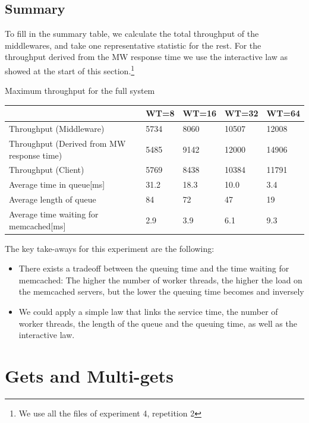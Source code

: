 \documentclass[11pt,a4paper]{article}
\begin{document}
\subsection{Summary}
To fill in the summary table, we calculate the total throughput of the middlewares, and take one representative statistic for the rest. For the throughput derived from the MW response time we use the interactive law as showed at the start of this section.\footnote{We use all the files of experiment 4, repetition 2} 
\begin{center}
	{Maximum throughput for the full system}
	\begin{tabular}{|l|p{1.5cm}|p{1.5cm}|p{1.5cm}|p{1.5cm}|}
		\hline                                            & WT=8 & WT=16 & WT=32 & WT=64 \\ 
		\hline Throughput (Middleware)                    &5734      &8060       &10507       &12008       \\ 
		\hline Throughput (Derived from MW response time) &5485      &9142       &12000       &14906       \\ 
		\hline Throughput (Client)                        &5769      &8438       &10384       &11791       \\ 
		\hline Average time in queue[ms]                      &31.2      &18.3       &10.0      &3.4       \\ 
		\hline Average length of queue                    &84      &72       &47       &19       \\ 
		\hline Average time waiting for memcached[ms]         &2.9      &3.9       &6.1       &9.3       \\ 
		\hline 
	\end{tabular}
\end{center}

The key take-aways for this experiment are the following: 
\begin{itemize}
\item There exists a tradeoff between the queuing time and the time waiting for memcached: The higher the number of worker threads, the higher the load on the memcached servers, but the lower the queuing time becomes and inversely
\item We could apply a simple law that links the service time, the number of worker threads, the length of the queue and the queuing time, as well as the interactive law. 
\end{itemize}
\newpage

\section{Gets and Multi-gets}
\end{document}
